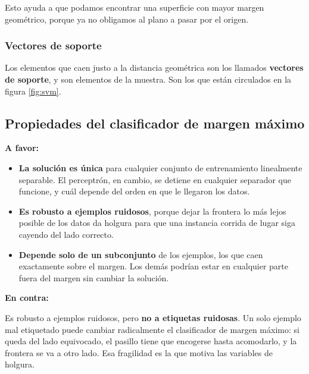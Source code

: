 \documentclass[11pt,letterpaper]{article}
\begin{document}
Esto ayuda a que podamos encontrar una superficie con mayor margen
geométrico, porque ya no obligamos al plano a pasar por el origen.

\subsubsection*{Vectores de soporte}

Los elementos que caen justo a la distancia geométrica son los
llamados \textbf{vectores de soporte}, y son elementos de la muestra.
Son los que están circulados en la figura \ref{fig:svm}.


\subsection*{Propiedades del clasificador de margen máximo}

\textbf{A favor:}

\begin{itemize}[itemsep=0.2em]
    \item \textbf{La solución es única} para cualquier conjunto de
          entrenamiento linealmente separable. El perceptrón, en
          cambio, se detiene en cualquier separador que funcione, y
          cuál depende del orden en que le llegaron los datos.
    \item \textbf{Es robusto a ejemplos ruidosos}, porque dejar la
          frontera lo más lejos posible de los datos da holgura para
          que una instancia corrida de lugar siga cayendo del lado
          correcto.
    \item \textbf{Depende solo de un subconjunto} de los ejemplos, los
          que caen exactamente sobre el margen. Los demás podrían
          estar en cualquier parte fuera del margen sin cambiar la
          solución.
\end{itemize}

\textbf{En contra:}

\begin{ojo}
  Es robusto a ejemplos ruidosos, pero \textbf{no a etiquetas
  ruidosas}. Un solo ejemplo mal etiquetado puede cambiar
  radicalmente el clasificador de margen máximo: si queda del lado
  equivocado, el pasillo tiene que encogerse hasta acomodarlo, y la
  frontera se va a otro lado. Esa fragilidad es la que motiva las
  variables de holgura.
\end{ojo}

\end{document}
